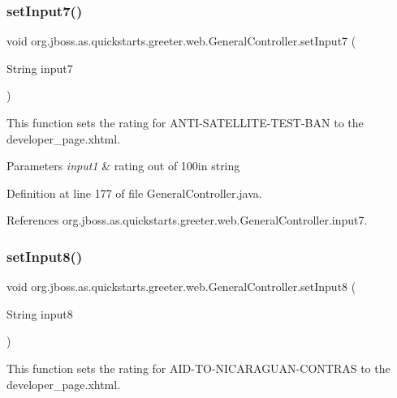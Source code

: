 \subsubsection{\texorpdfstring{set\+Input7()}{setInput7()}}
{\footnotesize\ttfamily void org.\+jboss.\+as.\+quickstarts.\+greeter.\+web.\+General\+Controller.\+set\+Input7 (\begin{DoxyParamCaption}\item[{String}]{input7 }\end{DoxyParamCaption})}



This function sets the rating for A\+N\+T\+I-\/\+S\+A\+T\+E\+L\+L\+I\+T\+E-\/\+T\+E\+S\+T-\/\+B\+AN to the developer\+\_\+page.\+xhtml. 


\begin{DoxyParams}{Parameters}
{\em input1} & rating out of 100in string \\
\hline
\end{DoxyParams}


Definition at line 177 of file General\+Controller.\+java.



References org.\+jboss.\+as.\+quickstarts.\+greeter.\+web.\+General\+Controller.\+input7.

\mbox{\label{classorg_1_1jboss_1_1as_1_1quickstarts_1_1greeter_1_1web_1_1_general_controller_a6a6e3698c0c1e1ceb8730c78df500528}} 
\subsubsection{\texorpdfstring{set\+Input8()}{setInput8()}}
{\footnotesize\ttfamily void org.\+jboss.\+as.\+quickstarts.\+greeter.\+web.\+General\+Controller.\+set\+Input8 (\begin{DoxyParamCaption}\item[{String}]{input8 }\end{DoxyParamCaption})}



This function sets the rating for A\+I\+D-\/\+T\+O-\/\+N\+I\+C\+A\+R\+A\+G\+U\+A\+N-\/\+C\+O\+N\+T\+R\+AS to the developer\+\_\+page.\+xhtml. 


